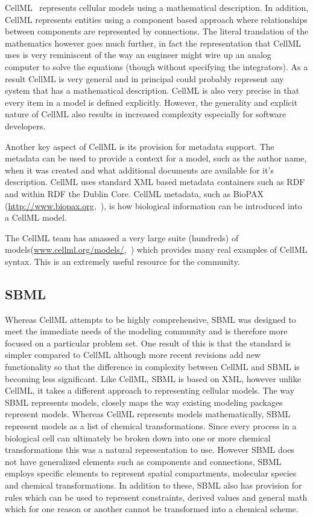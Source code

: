 \documentclass[12pt]{article}
\begin{document}
CellML~\citep{hedley:2001b,LloydCellML2004} represents cellular models using a
mathematical description. In addition, CellML represents entities
using a component based approach where relationships between
components are represented by connections. The literal translation
of the mathematics however goes much further, in fact the
representation that CellML uses is very reminiscent of the way an
engineer might wire up an analog computer to solve the equations
(though without specifying the integrators). As a result CellML is
very general and in principal could probably represent any system
that has a mathematical description. CellML is also very precise in
that every item in a model is defined explicitly. However, the
generality and explicit nature of CellML also results in increased
complexity especially for software developers.

Another key aspect of CellML is its provision for metadata support.
The metadata can be used to provide a context for a model, such as
the author name, when it was created and what additional documents
are available for it's description. CellML uses standard XML based
metadata containers such as RDF and within RDF the Dublin Core.
CellML metadata, such as BioPAX
(\url{http://www.biopax.org},~\citet{BioPax:2007}), is how biological
information can be introduced into a CellML model.

The CellML team has amassed a very large suite (hundreds) of
models(\url{www.cellml.org/models/},~\citet{Lloyd:2008}) which
provides many real examples of CellML syntax. This is an extremely
useful resource for the community.

\subsection{SBML}

Whereas CellML attempts to be highly comprehensive, SBML was
designed to meet the immediate needs of the modeling community and
is therefore more focused on a particular problem set. One result of
this is that the standard is simpler compared to CellML although
more recent revisions add new functionality so that the difference
in complexity between CellML and SBML is becoming less significant.
Like CellML, SBML is based on XML, however unlike CellML, it takes a
different approach to representing cellular models. The way SBML
represents models, closely maps the way existing modeling packages
represent models. Whereas CellML represents models mathematically,
SBML represent models as a list of chemical transformations. Since
every process in a biological cell can ultimately be broken down
into one or more chemical transformations this was a natural
representation to use. However SBML does not have generalized
elements such as components and connections, SBML employs specific
elements to represent spatial compartments, molecular species and
chemical transformations. In addition to these, SBML also has
provision for rules which can be used to represent constraints,
derived values and general math which for one reason or another
cannot be transformed into a chemical scheme.
\end{document}
